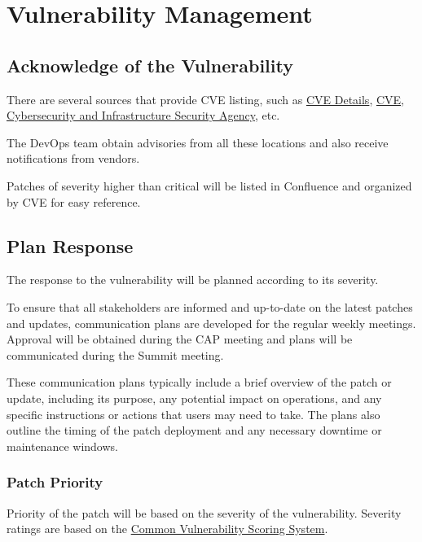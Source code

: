 \section{Vulnerability Management}

\subsection{Acknowledge of the Vulnerability}

There are several sources that provide CVE listing, such as \href{https://https://www.cvedetails.com/}{CVE Details}, \href{https://cve.org/}{CVE}, \href{https://www.cisa.gov/known-exploited-vulnerabilities-catalog}{Cybersecurity and Infrastructure Security Agency}, etc. 

The DevOps team obtain advisories from all these locations and also receive notifications from vendors. 

Patches of severity higher than critical will be listed in Confluence and organized by CVE for easy reference. 

\subsection{Plan Response}

The response to the vulnerability will be planned according to its severity.

To ensure that all stakeholders are informed and up-to-date on the latest patches and updates, communication plans are developed for the regular weekly meetings. Approval will be obtained during the CAP meeting and plans will be communicated during the Summit meeting. 

These communication plans typically include a brief overview of the patch or update, including its purpose, any potential impact on operations, and any specific instructions or actions that users may need to take. The plans also outline the timing of the patch deployment and any necessary downtime or maintenance windows. 

\subsubsection{Patch Priority}

Priority of the patch will be based on the severity of the vulnerability.
Severity ratings are based on the \href{https://nvd.nist.gov/vuln-metrics/cvss}{Common Vulnerability Scoring System}.  

